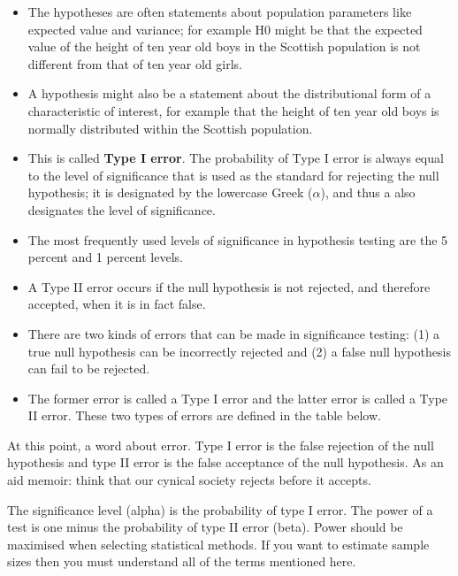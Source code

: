 

\begin{itemize}
\item The hypotheses are often statements about population parameters like expected value and variance; for example H0 might be that the expected value of the height of ten year old boys in the Scottish population is not different from that of ten year old girls.
\item  A hypothesis might also be a statement about the distributional form of a characteristic of interest, for example that the height of ten year old boys is normally distributed within the Scottish population.

\item This is called \textbf{Type I error}. The probability of Type I error is always equal to the level of significance that is used as the standard for rejecting the null hypothesis; it is designated by the
lowercase Greek  ($\alpha$), and thus a also designates the level of significance. 

\item The most frequently used levels of significance in hypothesis testing are the 5 percent and 1 percent levels.

\item A Type II error occurs if the null hypothesis is not rejected, and therefore accepted, when it is in fact false.

\item There are two kinds of errors that can be made in significance testing: (1) a true null hypothesis can be incorrectly rejected and (2) a false null hypothesis can fail to be rejected. 

\item The former error is called a Type I error and the latter error is called a Type II error. These two types of errors are defined in the table below. 
\end{itemize}





At this point, a word about error. Type I error is the false rejection of the null hypothesis and type II error is the false acceptance of the null hypothesis. As an aid memoir: think that our cynical society rejects before it accepts.

The significance level (alpha) is the probability of type I error. The power of a test is one minus the probability of type II error (beta). Power should be maximised when selecting statistical methods. If you want to estimate sample sizes then you must understand all of the terms mentioned here.

